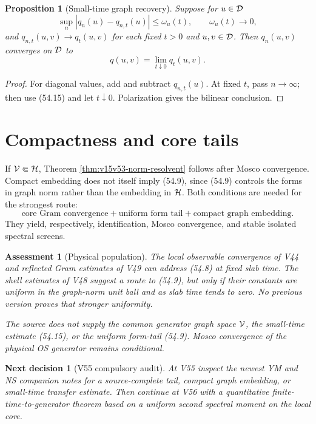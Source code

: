 \documentclass[11pt]{article}
\newtheorem{proposition}[theorem]{Proposition}
\newtheorem{decision}[theorem]{Next decision}
\newtheorem{assessment}[theorem]{Assessment}
\theoremstyle{remark}
\begin{document}
\begin{proposition}[Small-time graph recovery]
\label{prop:v15v54-small-time}
Suppose for \(u\in{\cal D}\)
\[
 \sup_n|q_n(u)-q_{n,t}(u)|\leq\omega_u(t),
 \qquad\omega_u(t)\to0,                                 \tag{54.15}
\]
and \(q_{n,t}(u,v)\to q_t(u,v)\) for each fixed \(t>0\) and
\(u,v\in{\cal D}\).  Then \(q_n(u,v)\) converges on
\({\cal D}\) to
\[
 q(u,v)=\lim_{t\downarrow0}q_t(u,v).                    \tag{54.16}
\]
\end{proposition}

\begin{proof}
For diagonal values, add and subtract \(q_{n,t}(u)\).  At fixed
\(t\), pass \(n\to\infty\); then use (54.15) and let
\(t\downarrow0\).  Polarization gives the bilinear conclusion.
\end{proof}

\section{Compactness and core tails}

If \({\cal V}\Subset{\cal H}\), Theorem
\ref{thm:v15v53-norm-resolvent} follows after Mosco convergence.
Compact embedding does not itself imply (54.9), since (54.9)
controls the forms in graph norm rather than the embedding in
\({\cal H}\).  Both conditions are needed for the strongest route:
\[
 \boxed{
 \text{core Gram convergence}
 +\text{uniform form tail}
 +\text{compact graph embedding}.}                      \tag{54.17}
\]
They yield, respectively, identification, Mosco convergence, and
stable isolated spectral screens.

\begin{assessment}[Physical population]
\label{ass:v15v54-status}
The local observable convergence of V44 and reflected Gram estimates
of V49 can address (54.8) at fixed slab time.  The shell estimates
of V48 suggest a route to (54.9), but only if their constants are
uniform in the graph-norm unit ball and as slab time tends to zero.
No previous version proves that stronger uniformity.

The source does not supply the common generator graph space
\({\cal V}\), the small-time estimate (54.15), or the uniform
form-tail (54.9).  Mosco convergence of the physical OS generator
remains conditional.
\end{assessment}

\begin{decision}[V55 compulsory audit]
\label{dec:v15v54-next}
At V55 inspect the newest YM and NS companion notes for a
source-complete tail, compact graph embedding, or small-time
transfer estimate.  Then continue at V56 with a quantitative
finite-time-to-generator theorem based on a uniform second spectral
moment on the local core.
\end{decision}
\end{document}
